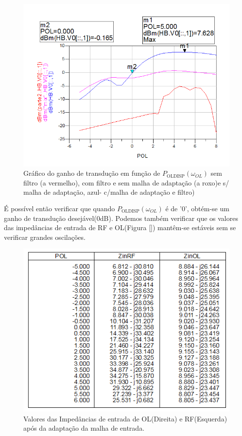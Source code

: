 \documentclass[11pt]{article}
\numberwithin{equation}{section}
\begin{document}
\begin{figure}[h]
\centering
\includegraphics[keepaspectratio=true, scale=0.45]{exps/GT_21}
\vspace{-0.5em}
\caption{Gráfico do ganho de transdução em função de $ P_{\text{OLDISP}}\left(\omega_{OL}\right) $ sem filtro (a vermelho), com filtro e sem malha de adaptação (a roxo)e s/ malha de adaptação, azul- c/malha de adaptação e filtro)}
\vspace{-0.8em}
\label{fig:GT_21}
\end{figure}

É possível então verificar que quando $ P_{\text{OLDISP}}\left(\omega_{OL}\right) $ é de '0', obtém-se um ganho de transdução desejável(0dB). Podemos também verificar que  os valores das impedâncias de entrada de RF e OL(Figura \ref{}) mantêm-se estáveis sem se verificar grandes oscilações.

\begin{figure}[h]
\centering
\includegraphics[keepaspectratio=true, scale=0.45]{exps/Z_21}
\vspace{-0.5em}
\caption{Valores das Impedâncias de entrada de OL(Direita) e RF(Esquerda) após da adaptação da malha de entrada.}
\vspace{-0.8em}
\label{fig:Imp_OL_RF_21}
\end{figure}
\end{document}
